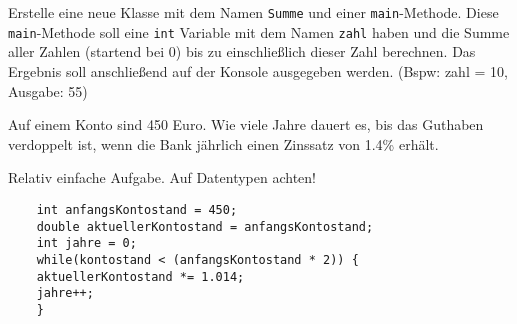 \begin{questions}

Erstelle eine neue Klasse mit dem Namen \texttt{Summe} und einer \texttt{main}-Methode. Diese \texttt{main}-Methode soll eine \texttt{int} Variable mit dem Namen \texttt{zahl} haben und die Summe aller Zahlen (startend bei 0) bis zu einschließlich dieser Zahl berechnen. Das Ergebnis soll anschließend auf der Konsole ausgegeben werden.
(Bspw:    zahl = 10, Ausgabe: 55)

Auf einem Konto sind 450 Euro. Wie viele Jahre dauert es, bis das Guthaben verdoppelt ist, wenn die Bank j\"ahrlich einen Zinssatz von 1.4\% erhält.%

\begin{solution}
    Relativ einfache    Aufgabe. Auf Datentypen achten!
    \begin{lstlisting}
    int anfangsKontostand = 450;
    double aktuellerKontostand = anfangsKontostand;
    int jahre = 0;
    while(kontostand < (anfangsKontostand * 2)) {
    aktuellerKontostand *= 1.014;
    jahre++;
    }
    \end{lstlisting}
\end{solution}

\end{questions}

